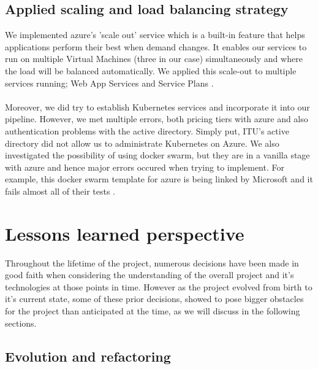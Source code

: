\documentclass{article}
\begin{document}
\subsection{Applied scaling and load balancing strategy} 
We implemented azure's 'scale out' service which is a built-in feature that helps applications perform their best when demand changes. It enables our services to run on multiple Virtual Machines (three in our case) simultaneously and where the load will be balanced automatically. We applied this scale-out to multiple services running; Web App Services and Service Plans \cite{scaleout}. 
\\
\\
Moreover, we did try to establish Kubernetes services and incorporate it into our pipeline. However, we met multiple errors, both pricing tiers with azure and also authentication problems with the active directory. Simply put, ITU's active directory did not allow us to administrate Kubernetes on Azure. We also investigated the possibility of using docker swarm, but they are in a vanilla stage with azure and hence major errors occured when trying to implement. For example, this docker swarm template for azure is being linked by Microsoft and it fails almost all of their tests \cite{dockerswarm}.   


\section{Lessons learned perspective}
Throughout the lifetime of the project, numerous decisions have been made in good faith when considering the understanding of the overall project and it's technologies at those points in time. However as the project evolved from birth to it's current state, some of these prior decisions, showed to pose bigger obstacles for the project than anticipated at the time, as we will discuss in the following sections.
\subsection{Evolution and refactoring} 
\end{document}
